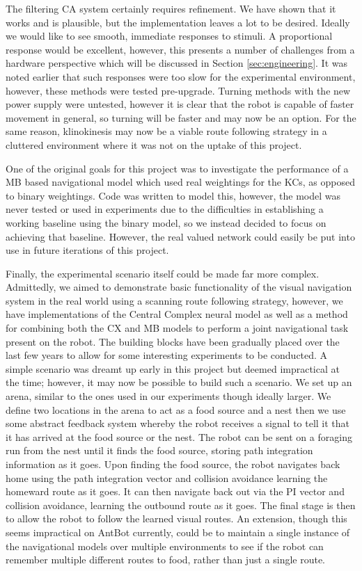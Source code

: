 \documentclass[a4paper,12pt,twoside,openright]{article}
\begin{document}
The filtering CA system certainly requires refinement. We have shown that it works and is plausible, but
the implementation leaves a lot to be desired. Ideally we would like to see smooth, immediate responses
to stimuli. A proportional response would be excellent, however, this presents a number of challenges
from a hardware perspective which will be discussed in Section \ref{sec:engineering}. It was noted earlier
that such responses were too slow for the experimental environment, however, these methods were tested
pre-upgrade. Turning methods with the new power supply were untested, however it is clear that the robot
is capable of faster movement in general, so turning will be faster and may now be an option. For the
same reason, klinokinesis may now be a viable route following strategy in a cluttered environment where
it was not on the uptake of this project.
\newline

One of the original goals for this project was to investigate the performance of a MB based navigational
model which used real weightings for the KCs, as opposed to binary weightings. Code was written
to model this, however, the model was never tested or used in experiments due to the difficulties in
establishing a working baseline using the binary model, so we instead decided to focus on achieving that
baseline. However, the real valued network could easily be put into use in future iterations of this project.
\newline

Finally, the experimental scenario itself could be made far more complex. Admittedly, we aimed to demonstrate
basic functionality of the visual navigation system in the real world using a scanning route following strategy,
however, we have implementations of the Central Complex neural model as well as a method for combining
both the CX and MB models to perform a joint navigational task \cite{Zhang2017, Scimeca2017} present on the robot.
The building blocks have been gradually placed over the last few years to allow for some interesting experiments to
be conducted. A simple scenario was dreamt up early in this project but deemed impractical at the time; however,
it may now be possible to build such a scenario. We set up an arena, similar to the ones used in our experiments
though ideally larger. We define two locations in the arena to act as a food source and a nest then we use some
abstract feedback system whereby the robot receives a signal to tell it that it has arrived at the food source or
the nest. The robot can be sent on a foraging run from the nest until it finds the food source, storing path
integration information as it goes. Upon finding the food source, the robot navigates back home using
the path integration vector and collision avoidance learning the homeward route as it goes. It can then
navigate back out via the PI vector and collision avoidance, learning the outbound route as it goes. The final
stage is then to allow the robot to follow the learned visual routes. An extension, though this seems impractical
on AntBot currently, could be to maintain a single instance of the navigational models over multiple environments
to see if the robot can remember multiple different routes to food, rather than just a single route.
 
\end{document}
